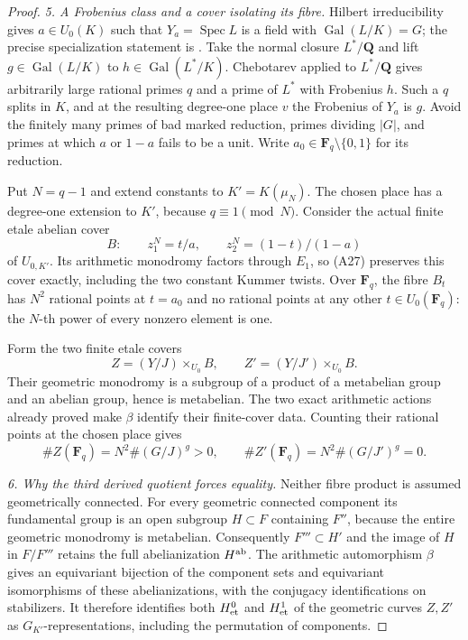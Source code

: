 \begin{proof}
\emph{5. A Frobenius class and a cover isolating its fibre.}
Hilbert irreducibility gives $a\in U_0(K)$ such that
$Y_a=\operatorname{Spec}L$ is a field with
$\operatorname{Gal}(L/K)=G$; the precise specialization
statement is \cite[Proposition 3.3.1 and Theorem 3.4.1]{A_SerreTopics}.
Take the normal closure $L^*/\mathbf Q$ and lift
$g\in\operatorname{Gal}(L/K)$ to
$h\in\operatorname{Gal}(L^*/K)$.
Chebotarev applied to $L^*/\mathbf Q$
\cite[Chapter V, Theorem 3.23]{A_MilneCFT}
gives arbitrarily large rational primes $q$ and a prime
of $L^*$ with Frobenius $h$. Such a $q$ splits in $K$,
and at the resulting degree-one place $v$ the Frobenius
of $Y_a$ is $g$. Avoid the finitely many primes of bad
marked reduction, primes dividing $|G|$, and primes
at which $a$ or $1-a$ fails to be a unit. Write
$a_0\in\mathbf F_q\setminus\{0,1\}$ for its reduction.

Put $N=q-1$ and extend constants to $K'=K(\mu_N)$.
The chosen place has a degree-one extension to $K'$,
because $q\equiv1\pmod N$. Consider the actual finite
etale abelian cover
\[
 B:\qquad z_1^N=t/a,\qquad
               z_2^N=(1-t)/(1-a)                            \tag{A29}
\]
of $U_{0,K'}$. Its arithmetic monodromy factors through
$E_1$, so (A27) preserves this cover exactly, including
the two constant Kummer twists. Over $\mathbf F_q$,
the fibre $B_t$ has $N^2$ rational points at $t=a_0$
and no rational points at any other $t\in U_0(\mathbf F_q)$:
the $N$-th power of every nonzero element is one.

Form the two finite etale covers
\[
 Z=(Y/J)\times_{U_0}B,
       \qquad Z'=(Y/J')\times_{U_0}B.
\]
Their geometric monodromy is a subgroup of a product
of a metabelian group and an abelian group, hence is
metabelian. The two exact arithmetic actions already
proved make $\beta$ identify their finite-cover data.
Counting their rational points at the chosen place gives
\[
 \#Z(\mathbf F_q)=N^2\#(G/J)^g>0,
       \qquad \#Z'(\mathbf F_q)=N^2\#(G/J')^g=0.              \tag{A30}
\]

\emph{6. Why the third derived quotient forces equality.}
Neither fibre product is assumed geometrically connected.
For every geometric connected component its fundamental
group is an open subgroup $H\subset F$ containing $F''$,
because the entire geometric monodromy is metabelian.
Consequently $F'''\subset H'$ and the image of $H$ in
$F/F'''$ retains the full abelianization $H^{\rm ab}$.
The arithmetic automorphism $\beta$ gives an equivariant
bijection of the component sets and equivariant
isomorphisms of these abelianizations, with the conjugacy
identifications on stabilizers. It therefore identifies
both $H^0_{\rm et}$ and $H^1_{\rm et}$ of the geometric
curves $Z,Z'$ as $G_{K'}$-representations, including the
permutation of components.


\end{proof}
